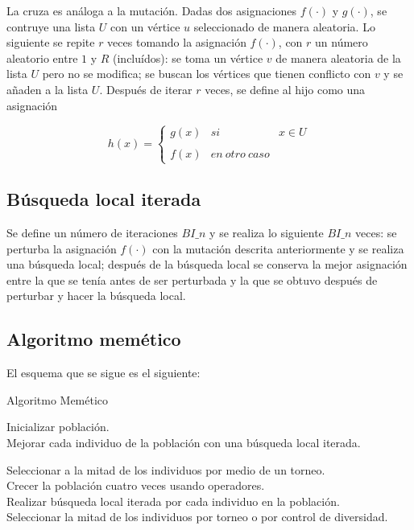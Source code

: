 \documentclass[10pt,a4paper]{article}
\begin{document}
\noindent La cruza es análoga a la mutación. Dadas dos asignaciones $f(\cdot)$ y $g(\cdot)$, se contruye una lista $U$ con un vértice $u$ seleccionado de manera aleatoria. Lo siguiente se repite $r$ veces tomando la asignación $f(\cdot)$, con $r$ un número aleatorio entre $1$ y $R$ (incluídos): se toma un vértice $v$ de manera aleatoria de la lista $U$ pero no se modifica; se buscan los vértices que tienen conflicto con $v$ y se añaden a la lista $U$. Después de iterar $r$ veces, se define al hijo como una asignación

\begin{equation*}
h(x)= \left\{ \begin{array}{lcc}
             g(x) &   si  & x \in U  \\
             \\ f(x) & en\ otro\ caso &
             \end{array}
   \right.
\end{equation*}

\subsection*{Búsqueda local iterada}

\noindent Se define un número de iteraciones $BI\_n$ y se realiza lo siguiente $BI\_n$ veces: se perturba la asignación $f(\cdot)$ con la mutación descrita anteriormente y se realiza una búsqueda local; después de la búsqueda local se conserva la mejor asignación entre la que se tenía antes de ser perturbada y la que se obtuvo después de perturbar y hacer la búsqueda local.

\subsection*{Algoritmo memético}

\noindent El esquema que se sigue es el siguiente:

\begin{algorithm}[H] %
\caption{Algoritmo Memético} 
\label{algoritmo1}
\SetAlgoLined

Inicializar población.\\
Mejorar cada individuo de la población con una búsqueda local iterada.\\

 { \label{parar}

	Seleccionar a la mitad de los individuos por medio de un torneo. \\
	Crecer la población cuatro veces usando operadores. \\ \label{operadores}
	Realizar búsqueda local iterada por cada individuo en la población. \\
	Seleccionar la mitad de los individuos por torneo o por control de diversidad. \label{opcion}

}


\end{algorithm}
\end{document}
